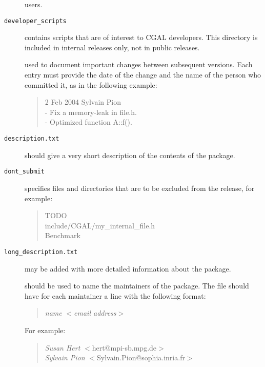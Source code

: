 \begin{description}
       users.
     \item[{\tt developer\_scripts}] contains
       scripts that are of interest to CGAL developers. This directory
       is included in internal releases only, not in public releases.
  \item[\ccAnchor{example/changes.txt}{{\tt changes.txt}}]%
     used to document important
    changes between subsequent versions. Each entry must provide the
    date of the change and the name of the person who committed it, as
    in the following example:
       \begin{verse}
       2 Feb 2004  Sylvain Pion\\
       - Fix a memory-leak in file.h.\\
       - Optimized function A::f().
       \end{verse}

  \item[{\tt description.txt}]%
       should give a very short description of the contents of the package. 
  \item[{\tt dont\_submit}]%
     specifies files and directories
    that are to be excluded from the release, for example:
    \begin{verse}
      TODO\\
      include/CGAL/my\_internal\_file.h\\
      Benchmark      
    \end{verse}
  \item[{\tt long\_description.txt}]%
       may be added with more detailed information about the package. 
  \item[\ccAnchor{maintainer}{{\tt maintainer}}]%
       should be used to name the maintainers of the package. The file should
       have for each maintainer a line with the following format:
       \begin{verse}
       {\it name} $<${\it email address}$>$\\
       \end{verse}
       For example:
       \begin{verse}
       {\it Susan Hert} $<$hert@mpi-sb.mpg.de$>$\\
       {\it Sylvain Pion} $<$Sylvain.Pion@sophia.inria.fr$>$\\
       \end{verse}
\end{description}

